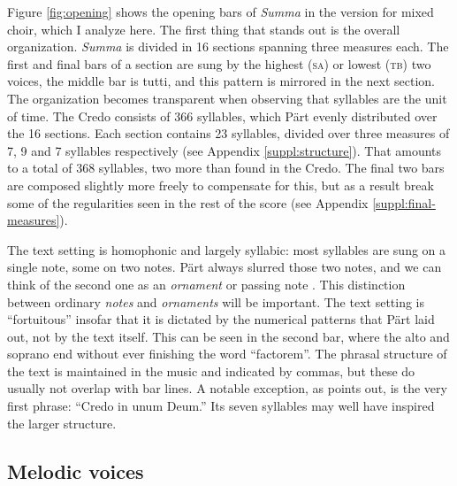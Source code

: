 \documentclass{interact}
\let\footnote=\endnote
\begin{document}
Figure \ref{fig:opening} shows the opening bars of \emph{Summa} in the version for mixed choir, which I analyze here.%
\footnote{%
    UE 33 686, Korr.~III/2012, to be precise.
}
The first thing that stands out is the overall organization.
\emph{Summa} is divided in 16 sections spanning three measures each.
The first and final bars of a section are sung by the highest (\textsc{sa}) or lowest (\textsc{tb}) two voices, the middle bar is tutti, and this pattern is mirrored in the next section.
The organization becomes transparent when observing that syllables are the unit of time.
The Credo consists of 366 syllables, which Pärt evenly distributed over the 16 sections.
Each section contains 23 syllables, divided over three measures of 7, 9 and 7 syllables respectively (see Appendix \ref{suppl:structure}).
That amounts to a total of 368 syllables, two more than found in the Credo.
The final two bars are composed slightly more freely to 
compensate for this, but as a result break some of the regularities seen in the rest of the score (see Appendix \ref{suppl:final-measures}).


The text setting is homophonic and largely syllabic: most syllables are sung on a single note, some on two notes.
Pärt always slurred those two notes, and we can think of the second one as an \emph{ornament} or passing note \parencite[cf.][]{Hillier1997}.
This distinction between ordinary \emph{notes} and \emph{ornaments} will be important.
The text setting is ``fortuitous'' \parencite{Hillier1997} insofar that it is dictated by the numerical patterns that Pärt laid out, not by the text itself. 
This can be seen in the second bar, where the alto and soprano end without ever finishing the word ``factorem''.
The phrasal structure of the text is maintained in the music and indicated by commas, but these do usually not overlap with bar lines.
A notable exception, as \textcite{Hillier1997} points out, is the very first phrase: ``Credo in unum Deum.''
Its seven syllables may well have inspired the larger structure.


\subsection{Melodic voices}
\end{document}
